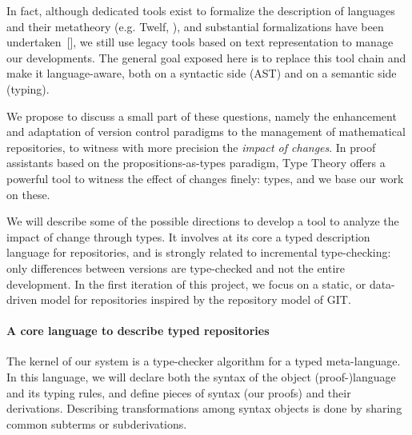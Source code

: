 \documentclass{article}
\newcommand{\remplan}[1]{\noindent\textcolor{bwblue}{$\triangleright$ \textbf{#1}}}
\newcommand{\remtext}[1]{\textcolor{bwgreen}{$\triangleright$ \textsl{#1}}}
\renewcommand{\remplan}[1]{}
\renewcommand{\remtext}[1]{}
\begin{document}
In fact, although dedicated tools exist to formalize the description
of languages and their metatheory (e.g. \textsf{Twelf},
{\cite{pfenning1999system}}), and substantial formalizations have been
undertaken~[]\cite{lee07}, we still use legacy tools
based on text representation to manage our developments. The general
goal exposed here is to replace this tool chain and make it
language-aware, both on a syntactic side (AST) and on a semantic side
(typing).

\remplan{Sujet du papier : on focalise sur un problème bien précis}

\remtext{Fri Jun 18, 2010 10:00 AM.
  Un peu de liant. Pour arriver à notre but, il y a une
  question importante à résoudre: si on te donne une méta-théorie
  formalisée, es-tu capable de décrire l'historique d'un développement
  dans cette théorie? Cela induit deux questions : dans quel langage
  et est-ce que ce langage est utilisable (parce qu'a priori, ce n'est
  pas gagné car le développeur travaille en mode ``instantané'' et ne
  veut pas se trimballer ses casseroles tout le temps\ldots).}

We propose to discuss a small part of these questions, namely the
enhancement and adaptation of version control paradigms to the
management of mathematical repositories, to witness with more
precision the \emph{impact of changes}. In proof assistants based on
the propositions-as-types paradigm, Type Theory offers a powerful tool
to witness the effect of changes finely: types, and we base our work
on these.

We will describe some of the possible directions to develop a tool to
analyze the impact of change through types. It involves at its core a
typed description language for repositories, and is strongly related
to incremental type-checking: only differences between versions are
type-checked and not the entire development. In the first iteration of
this project, we focus on a static, or data-driven model for
repositories inspired by the repository model of \textsf{GIT}.

\paragraph{A core language to describe typed repositories}

The kernel of our system is a type-checker algorithm for a typed
meta-language. In this language, we will declare both the syntax of
the object (proof-)language and its typing rules, and define pieces of
syntax (our proofs) and their derivations. Describing transformations
among syntax objects is done by sharing common subterms or
subderivations.
\end{document}
